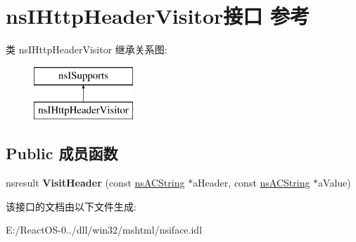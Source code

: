 \hypertarget{interfacens_i_http_header_visitor}{}\section{ns\+I\+Http\+Header\+Visitor接口 参考}
\label{interfacens_i_http_header_visitor}
类 ns\+I\+Http\+Header\+Visitor 继承关系图\+:\begin{figure}[H]
\begin{center}
\leavevmode
\includegraphics[height=2.000000cm]{interfacens_i_http_header_visitor}
\end{center}
\end{figure}
\subsection*{Public 成员函数}
\begin{DoxyCompactItemize}
\item 
\mbox{\label{interfacens_i_http_header_visitor_a9448a80e9141e6ee89bc23b4240f4d67}} 
nsresult {\bfseries Visit\+Header} (const \hyperlink{structns_c_string_container}{ns\+A\+C\+String} $\ast$a\+Header, const \hyperlink{structns_c_string_container}{ns\+A\+C\+String} $\ast$a\+Value)
\end{DoxyCompactItemize}


该接口的文档由以下文件生成\+:\begin{DoxyCompactItemize}
\item 
E\+:/\+React\+O\+S-\/0../dll/win32/mshtml/nsiface.\+idl\end{DoxyCompactItemize}
